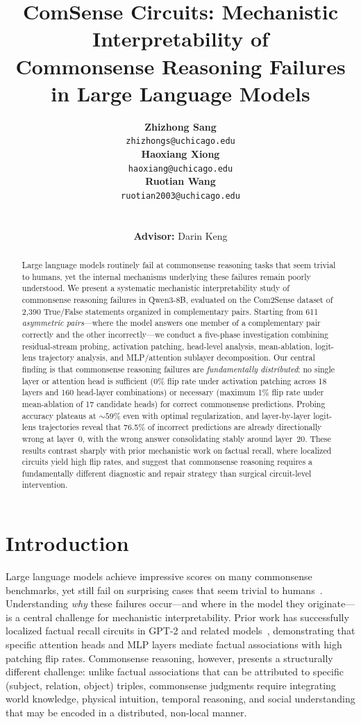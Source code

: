 \documentclass{article}
\title{ComSense Circuits: Mechanistic Interpretability of\\
Commonsense Reasoning Failures in Large Language Models}
\author{%
  \begin{tabular}[t]{c}\bf Zhizhong Sang \\ \texttt{zhizhongs@uchicago.edu}\end{tabular} \hfill
  \begin{tabular}[t]{c}\bf Haoxiang Xiong \\ \texttt{haoxiang@uchicago.edu}\end{tabular} \hfill
  \begin{tabular}[t]{c}\bf Ruotian Wang \\ \texttt{ruotian2003@uchicago.edu}\end{tabular} \\
  \\[0.5em]
  \textbf{Advisor:} Darin Keng
}
\begin{document}
\maketitle

\begin{abstract}
Large language models routinely fail at commonsense reasoning tasks that seem trivial to humans, yet the internal mechanisms underlying these failures remain poorly understood.
We present a systematic mechanistic interpretability study of commonsense reasoning failures in Qwen3-8B, evaluated on the Com2Sense dataset of 2,390 True/False statements organized in complementary pairs.
Starting from 611 \emph{asymmetric pairs}---where the model answers one member of a complementary pair correctly and the other incorrectly---we conduct a five-phase investigation combining residual-stream probing, activation patching, head-level analysis, mean-ablation, logit-lens trajectory analysis, and MLP/attention sublayer decomposition.
Our central finding is that commonsense reasoning failures are \emph{fundamentally distributed}: no single layer or attention head is sufficient (0\% flip rate under activation patching across 18 layers and 160 head-layer combinations) or necessary (maximum 1\% flip rate under mean-ablation of 17 candidate heads) for correct commonsense predictions.
Probing accuracy plateaus at ${\sim}59$\% even with optimal regularization, and layer-by-layer logit-lens trajectories reveal that 76.5\% of incorrect predictions are already directionally wrong at layer~0, with the wrong answer consolidating stably around layer~20.
These results contrast sharply with prior mechanistic work on factual recall, where localized circuits yield high flip rates, and suggest that commonsense reasoning requires a fundamentally different diagnostic and repair strategy than surgical circuit-level intervention.
\end{abstract}

\section{Introduction}
\label{sec:intro}

Large language models achieve impressive scores on many commonsense benchmarks, yet still fail on surprising cases that seem trivial to humans~\citep{davis2023commonsense}.
Understanding \emph{why} these failures occur---and where in the model they originate---is a central challenge for mechanistic interpretability.
Prior work has successfully localized factual recall circuits in GPT-2 and related models~\citep{wang2022interpretability, geva2023dissecting, meng2022locating}, demonstrating that specific attention heads and MLP layers mediate factual associations with high patching flip rates.
Commonsense reasoning, however, presents a structurally different challenge: unlike factual associations that can be attributed to specific (subject, relation, object) triples, commonsense judgments require integrating world knowledge, physical intuition, temporal reasoning, and social understanding that may be encoded in a distributed, non-local manner.
\end{document}

